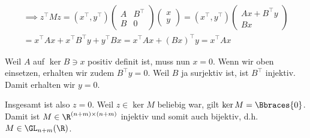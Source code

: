 \begin{solution}
\begin{enumerate}[label = \textbf{\alph*)}]
\begin{itemize}
    \begin{multline*}
      \implies
      z^\top M z
      =
      (x^\top, y^\top)
      \begin{pmatrix}
        A & B^\top \\
        B & 0
      \end{pmatrix}
      \begin{pmatrix}
        x \\ y
      \end{pmatrix}
      =
      (x^\top, y^\top)
      \begin{pmatrix}
        A x + B^\top y \\
        B x
      \end{pmatrix} \\
      =
      x^\top A x + x^\top B^\top y + y^\top B x
      =
      x^\top A x + (B x)^\top y
      =
      x^\top A x
    \end{multline*}

    Weil $A$ auf $\ker B \ni x$ positiv definit ist, muss nun $x = 0$.
    Wenn wir oben einsetzen, erhalten wir zudem $B^\top y = 0$.
    Weil $B$ ja surjektiv ist, ist $B^\top$ injektiv.
    Damit erhalten wir $y = 0$.

    Insgesamt ist also $z = 0$.
    Weil $z \in \ker M$ beliebig war, gilt $\ker M = \Bbraces{0}$.
    Damit ist $M \in \R^{(n+m) \times (n+m)}$ injektiv und somit auch bijektiv, d.h. $M \in \GL_{n + m}(\R)$.

  \end{itemize}

\end{enumerate}

\end{solution}


